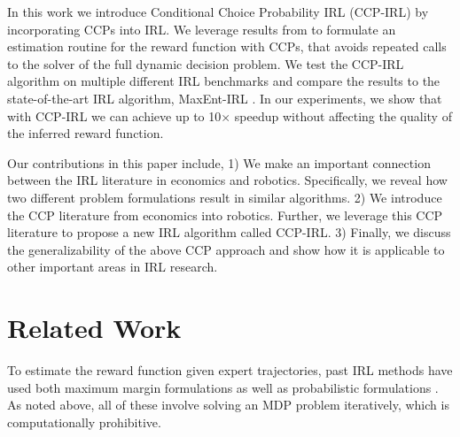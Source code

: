 \documentclass{article}
\begin{document}
In this work we introduce Conditional Choice Probability IRL (CCP-IRL) by incorporating CCPs into IRL. We leverage results from \cite{rust_gmc, hotz, magnac} to formulate an estimation routine for the reward function with CCPs, that avoids repeated calls to the solver of the full dynamic decision problem. We test the CCP-IRL algorithm on multiple different IRL benchmarks and compare the results to the state-of-the-art IRL algorithm, MaxEnt-IRL \cite{ziebart}. In our experiments, we show that with CCP-IRL we can achieve up to 10$\times$ speedup without affecting the quality of the inferred reward function. 


Our contributions in this paper include, 1) We make an important connection between the IRL literature in economics and robotics. Specifically, we reveal how two different problem formulations result in similar algorithms. 2) We introduce the CCP literature from economics into robotics. Further, we leverage this CCP literature to propose a new IRL algorithm called CCP-IRL. 3) Finally, we discuss the generalizability of the above CCP approach and show how it is applicable to other important areas in IRL research.

\section{Related Work}

To estimate the reward function given expert trajectories, past IRL methods have used both maximum margin formulations \cite{abbeel2004apprenticeship, Ratliff2006} as well as probabilistic formulations \cite{ziebart}. As noted above, all of these involve solving an MDP problem iteratively, which is computationally prohibitive.
\end{document}
